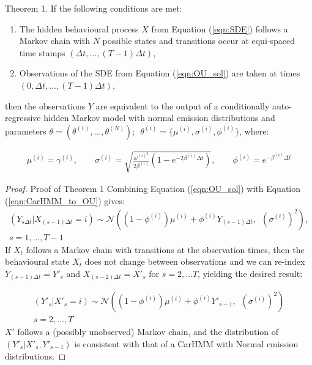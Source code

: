 \begin{theorem}{Theorem 1.}{}%
If the following conditions are met:
\begin{enumerate}
    \item The hidden behavioural process $X$ from Equation (\ref{eqn:SDE}) follows a Markov chain with $N$ possible states and transitions occur at equi-spaced time stamps $\left(\Delta t, \ldots, (T-1)\Delta t\right)$,
    
    \item Observations of the SDE from Equation (\ref{eqn:OU_sol}) are taken at times $\left(0, \Delta t, \ldots, (T-1)\Delta t\right)$,
\end{enumerate}
then the observations $Y$ are equivalent to the output of a conditionally auto-regressive hidden Markov model with normal emission distributions and parameters $\theta = (\theta^{(1)}, \ldots, \theta^{(N)}); \enspace \theta^{(i)} = \{\mu^{(i)},\sigma^{(i)},\phi^{(i)}\}$, where:

\begin{align}
\mu^{(i)} = \gamma^{(i)}, \qquad \sigma^{(i)} = \sqrt{\frac{\omega^{(i)^2}}{2\beta^{(i)}} (1-e^{-2\beta^{(i)}\Delta t})}, \qquad \phi^{(i)} = e^{-\beta^{(i)}\Delta t} \label{eqn:CarHMM_to_OU}
\end{align}

\end{theorem}

\begin{proof}{Proof of Theorem 1}{}
Combining Equation (\ref{eqn:OU_sol}) with Equation (\ref{eqn:CarHMM_to_OU}) gives:
%
\begin{align*}
\left(Y_{s \Delta t} | X_{(s-1)\Delta t} = i \right) \sim \mathcal{N}\left((1-\phi^{(i)}) \mu^{(i)} + \phi^{(i)} Y_{(s-1) \Delta t}, \enspace \left(\sigma^{(i)}\right)^2 \right),\\
s = 1, \ldots, T-1
\end{align*}
%
If $X_t$ follows a Markov chain with transitions at the observation times, then the behavioural state $X_t$ does not change between observations and we can re-index $Y_{(s-1) \Delta t} = Y'_s$ and $X_{(s-2)\Delta t} = X'_s$ for $s = 2,\ldots T$, yielding the desired result:

\begin{align*}
\left(Y'_s| X'_s = i \right) \sim \mathcal{N}\left((1-\phi^{(i)}) \mu^{(i)} + \phi^{(i)} Y'_{s-1}, \enspace \left(\sigma^{(i)}\right)^2 \right)\\
s = 2, \ldots, T
\end{align*}
%
$X'$ follows a (possibly unobserved) Markov chain, and the distribution of $(Y'_s|X'_s,Y'_{s-1})$ is consistent with that of a CarHMM with Normal emission distributions.
\end{proof}

